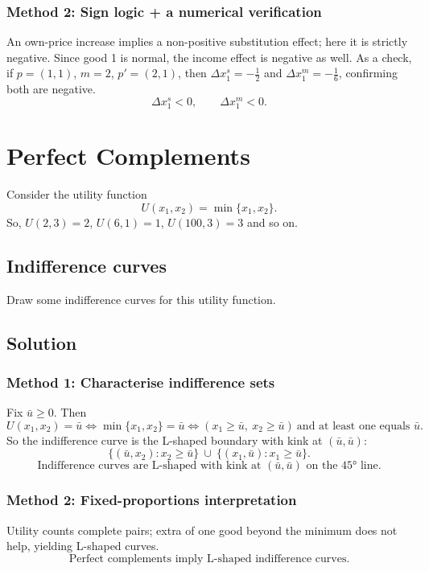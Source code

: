\documentclass[12pt]{article}
\begin{document}
\subsubsection*{Method 2: Sign logic + a numerical verification}
An own-price increase implies a non-positive substitution effect; here it is strictly negative. Since good 1 is normal, the income effect is negative as well.
As a check, if \(p=(1,1)\), \(m=2\), \(p'=(2,1)\), then \(\Delta x_1^{s}=-\tfrac12\) and \(\Delta x_1^{m}=-\tfrac16\), confirming both are negative.
\[
\boxed{\Delta x_1^{s}<0,\qquad \Delta x_1^{m}<0.}
\]

\newpage
\section{Perfect Complements}

Consider the utility function
\[
U(x_1,x_2)=\min\{x_1,x_2\}.
\]
So, \(U(2,3)=2\), \(U(6,1)=1\), \(U(100,3)=3\) and so on.

\subsection{Indifference curves}
Draw some indifference curves for this utility function.

\subsection*{Solution}
\subsubsection*{Method 1: Characterise indifference sets}
Fix \(\bar u\ge 0\). Then
\[
U(x_1,x_2)=\bar u
\iff \min\{x_1,x_2\}=\bar u
\iff (x_1\ge \bar u,\ x_2\ge \bar u)\ \text{and at least one equals }\bar u.
\]
So the indifference curve is the L-shaped boundary with kink at \((\bar u,\bar u)\):
\[
\{(\bar u,x_2):x_2\ge \bar u\}\ \cup\ \{(x_1,\bar u):x_1\ge \bar u\}.
\]
\[
\boxed{\text{Indifference curves are L-shaped with kink at }(\bar u,\bar u)\text{ on the 45° line.}}
\]

\subsubsection*{Method 2: Fixed-proportions interpretation}
Utility counts complete pairs; extra of one good beyond the minimum does not help, yielding L-shaped curves.
\[
\boxed{\text{Perfect complements imply L-shaped indifference curves.}}
\]
\end{document}
